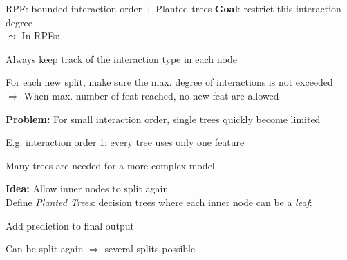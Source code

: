 \documentclass[10pt,compress,t,notes=noshow, xcolor=table]{beamer}
\begin{document}
\begin{framev}[align=top]{RPF: bounded interaction order + Planted trees}
\textbf{Goal}: restrict this interaction degree\\
$\leadsto$ In RPFs:
\begin{itemizeM}
\item Always keep track of the interaction type in each node
\item For each new split, make sure the max. degree of interactions is not exceeded\\ $\Rightarrow$ When max. number of feat reached, no new feat are allowed
\end{itemizeM}
\spacer[0.25]
\textbf{Problem:} For small interaction order, single trees quickly become limited
\begin{itemizeM}
\item E.g. interaction order 1: every tree uses only one feature
\item[$\Rightarrow$] Many trees are needed for a more complex model
\end{itemizeM}

\spacer[0.25]
\textbf{Idea:} Allow inner nodes to split again\\
\spacer[0.25]
Define \textit{Planted Trees}: decision trees where each inner node can be a \textit{leaf}:
\begin{itemizeM}
\item Add prediction to final output
\item Can be split again $\Rightarrow$ several splits possible
\end{itemizeM}
\end{framev}
\end{document}
